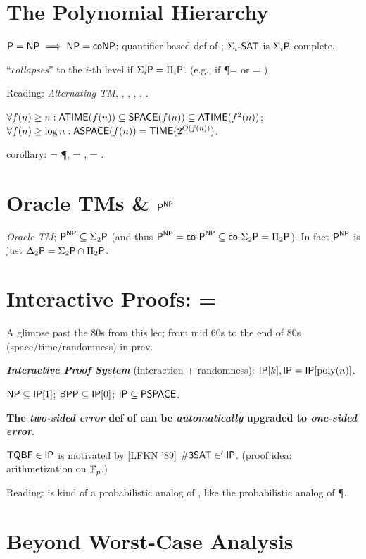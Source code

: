 \documentclass{article}
\begin{document}
\section{The Polynomial Hierarchy}

$\P = \NP \implies \NP = \coNP$;
quantifier-based def of \PH;
$\Sigma_i \prob{-SAT}$ is $\Sigma_i\P$-complete.
\par
\PH ``\textit{collapses}'' to the $i$-th level if $\Sigma_i\P = \Pi_i\P$. (e.g., if \P = \NP or \NP = \coNP)
\par
Reading: \textit{Alternating TM}, \ATIME, \ASPACE, \AP, \APSPACE, \AL.
\par
$\forall f(n) \geq n: \ATIME(f(n)) \subseteq \SPACE(f(n)) \subseteq \ATIME(f^2(n))$;
$\forall f(n) \geq \log n: \ASPACE(f(n)) = \TIME(2^{O(f(n))})$.
\par
corollary: \AL = \P, \AP = \PSPACE, \APSPACE = \EXP.


\section{Oracle TMs \& $\P^\NP$}

\textit{Oracle TM};
$\P^\NP \subseteq \Sigma_2\P$ (and thus $\P^\NP = \co\P^\NP \subseteq \co\Sigma_2\P = \Pi_2\P$). In fact $\P^\NP$ is just $\Delta_2\P = \Sigma_2\P \cap \Pi_2\P$.


\section{Interactive Proofs: \IP = \PSPACE}

A glimpse past the 80s from this lec; from mid 60s to the end of 80s (space/time/randomness) in prev.
\par
\textit{\textbf{Interactive Proof System}} (interaction + randomness): $\IP[k], \IP = \IP[\poly(n)]$.
\par
$\NP \subseteq \IP[1]$;
$\BPP \subseteq \IP[0]$;
$\IP \subseteq \PSPACE$.
\par
\textbf{The \textit{two-sided error} def of \IP can be \textit{automatically} upgraded to \textit{one-sided error}}.
\par
[Shamir '89] $\prob{TQBF} \in \IP$ is motivated by [LFKN '89] $\prob{\#3SAT} \in' \IP$. (proof idea: arithmetization on $\F_p$.)
\par
Reading: \IP is kind of a probabilistic analog of \NP, like the probabilistic analog \RP of \P.


\section{Beyond Worst-Case Analysis}
\end{document}
